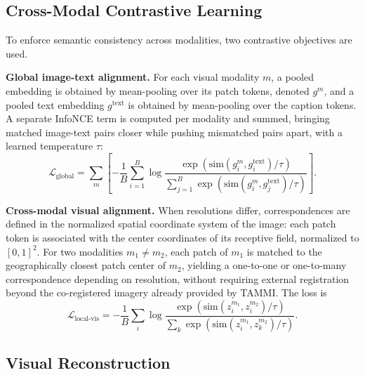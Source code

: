 \subsection{Cross-Modal Contrastive Learning}
\label{sec:chap6_method_contrastive}

To enforce semantic consistency across modalities, two contrastive
objectives are used.

\textbf{Global image-text alignment.} For each visual modality $m$, a
pooled embedding is obtained by mean-pooling over its patch tokens,
denoted $g^{m}$, and a pooled text embedding $g^{\text{text}}$ is
obtained by mean-pooling over the caption tokens. A separate InfoNCE
term is computed per modality and summed, bringing matched image-text
pairs closer while pushing mismatched pairs apart, with a learned
temperature $\tau$:
\[
\mathcal{L}_{\text{global}} = \sum_{m} \left[ -\frac{1}{B} \sum_{i=1}^{B}
\log \frac{\exp(\text{sim}(g^{m}_i, g^{\text{text}}_i)/\tau)}
{\sum_{j=1}^{B} \exp(\text{sim}(g^{m}_i, g^{\text{text}}_j)/\tau)} \right].
\]
 
\textbf{Cross-modal visual alignment.} When resolutions differ,
correspondences are defined in the normalized spatial coordinate
system of the image: each patch token is associated with the center
coordinates of its receptive field, normalized to $[0,1]^2$. For two
modalities $m_1 \neq m_2$, each patch of $m_1$ is matched to the
geographically closest patch center of $m_2$, yielding a one-to-one or
one-to-many correspondence depending on resolution, without requiring
external registration beyond the co-registered imagery already
provided by TAMMI. The loss is
\[
\mathcal{L}_{\text{local-vis}} = -\frac{1}{B} \sum_{i}
\log \frac{\exp(\text{sim}(z^{m_1}_i, z^{m_2}_i)/\tau)}
{\sum_{k} \exp(\text{sim}(z^{m_1}_i, z^{m_2}_k)/\tau)}.
\]

\subsection{Visual Reconstruction}
\label{sec:chap6_method_reconstruction}


